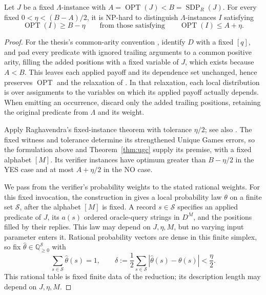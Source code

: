 \begin{corollary}\label{cor:raghavendra-consequence}
Let \(J\) be a fixed \(\Lambda\)-instance with
\(A=\operatorname{OPT}(J)<B=\operatorname{SDP}_{R}(J)\).
For every fixed \(0<\eta<(B-A)/2\), it is NP-hard to distinguish
\(\Lambda\)-instances \(I\) satisfying
\[
 \operatorname{OPT}(I)\ge B-\eta
 \qquad\text{from those satisfying}\qquad
 \operatorname{OPT}(I)\le A+\eta.
\]
\end{corollary}
\begin{proof}
For the thesis's common-arity convention
\cite[Definitions~7.2.1--7.2.2]{RaghavendraThesis09}, identify \(D\)
with a fixed \([q]\), and pad every predicate with ignored trailing
arguments to a common positive arity, filling the added positions with
a fixed variable of \(J\), which exists because \(A<B\). This leaves
each applied payoff and its dependence set unchanged, hence preserves
\(\operatorname{OPT}\) and the relaxation of
\cite[Section~4.5]{RaghavendraThesis09}.
In that relaxation, each local distribution is over assignments to
the variables on which its applied payoff actually depends.
When emitting an occurrence, discard only the added trailing positions,
retaining the original predicate from \(\Lambda\) and its weight.

Apply Raghavendra's fixed-instance theorem
\cite[Theorem~7.9]{RaghavendraThesis09} with tolerance \(\eta/2\);
see also \cite[Theorem~1.1 and Lemma~2.3]{Raghavendra08}.
The fixed witness and tolerance determine its strengthened Unique Games
errors, so the formulation above and Theorem~\ref{thm:ugc} supply its
premise, with a fixed alphabet \([M]\). Its verifier instances have
optimum greater than \(B-\eta/2\) in the YES case and at most
\(A+\eta/2\) in the NO case.

We pass from the verifier's probability weights to the stated rational
weights. For this fixed invocation, the construction in
\cite[Sections~7.3.1 and~7.5]{RaghavendraThesis09} gives a local
probability law \(\theta\) on a finite set \(\mathcal S\), after the
alphabet \([M]\) is fixed. A record \(s\in\mathcal S\) specifies an
applied predicate of \(J\), its \(a(s)\) ordered oracle-query strings
in \(D^M\), and the positions filled by their replies. This law may
depend on \(J,\eta,M\), but no varying input parameter enters it.
Rational probability vectors are dense in this finite simplex, so fix
\(\widehat\theta\in\mathbb Q_{\ge0}^{\mathcal S}\) with
\[
 \sum_{s\in\mathcal S}\widehat\theta(s)=1,
 \qquad
 \delta:=\frac12\sum_{s\in\mathcal S}
       |\widehat\theta(s)-\theta(s)|<\frac{\eta}{2}.
\]
This rational table is fixed finite data of the reduction; its
description length may depend on \(J,\eta,M\).


\end{proof}
